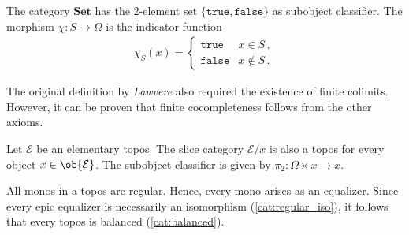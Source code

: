    \begin{example}
        The category $\mathbf{Set}$ has the 2-element set $\{\texttt{true},\texttt{false}\}$ as subobject classifier. The morphism $\chi:S\rightarrow\Omega$ is the indicator function
        \begin{gather}
            \chi_S(x)=
            \begin{cases}
                \texttt{true}&x\in S\,,\\
                \texttt{false}&x\not\in S\,.
            \end{cases}
        \end{gather}
    \end{example}

    \begin{remark}
        The original definition by \textit{Lawvere} also required the existence of finite colimits. However, it can be proven that finite cocompleteness follows from the other axioms.
    \end{remark}

    \begin{theorem}
        Let $\mathcal{E}$ be an elementary topos. The slice category $\mathcal{E}/x$ is also a topos for every object $x\in\ob{\mathcal{E}}$. The subobject classifier is given by $\pi_2:\Omega\times x\rightarrow x$.
    \end{theorem}

    \begin{property}[Balanced]
        All monos in a topos are regular. Hence, every mono arises as an equalizer. Since every epic equalizer is necessarily an isomorphism (\cref{cat:regular_iso}), it follows that every topos is balanced (\cref{cat:balanced}).
    \end{property}

